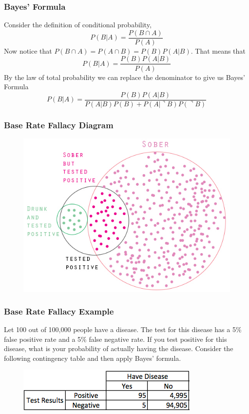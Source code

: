 \documentclass[xcolor=dvipsnames]{beamer}
\begin{document}
\begin{frame}
  \frametitle{Bayes' Formula}
Consider the definition of conditional probability,
\begin{equation}
  \label{eq:ohyeweeb}
  P(B|A)=\frac{P(B\cap{}A)}{P(A)}
\end{equation}
Now notice that $P(B\cap{}A)=P(A\cap{}B)=P(B)P(A|B)$. That means that
\begin{equation}
  \label{eq:maifiepu}
  P(B|A)=\frac{P(B)P(A|B)}{P(A)}
\end{equation}
By the law of total probability we can replace the denominator to give
us \alert{Bayes' Formula}
\begin{equation}
  \label{eq:ohrughai}
  P(B|A)=\frac{P(B)P(A|B)}{P(A|B)P(B)+P(A|\urcorner{}B)P(\urcorner{}B)}
\end{equation}
\end{frame}

\begin{frame}
  \frametitle{Base Rate Fallacy Diagram}
\begin{figure}[h]
\includegraphics[scale=.4]{./diagrams/Detect-drunk-driving.jpg}
\end{figure}
\end{frame}

\begin{frame}
  \frametitle{Base Rate Fallacy Example}
  Let 100 out of 100,000 people have a disease. The test for this
  disease has a 5\% \alert{false positive} rate and a 5\% \alert{false
    negative} rate. If you test positive for this disease, what is
  your probability of actually having the disease. Consider the
  following \alert{contingency table} and then apply Bayes'
  formula.
\begin{figure}[h]
\includegraphics[scale=.7]{./diagrams/baserate3.png}
\end{figure}
\end{frame}
\end{document}
